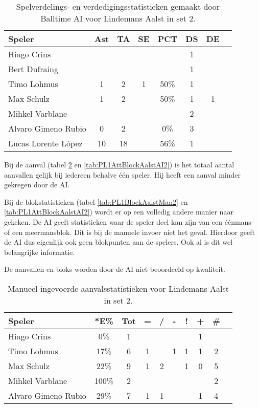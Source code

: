 \begin{table}[ht!]
  \centering
  \scriptsize
  \begin{tabular}{|l|c|c|c|c|c|c|c|} \hline
    \textbf{Speler} & Ast & TA & SE & PCT & DS & DE \\ \hline
    Hiago Crins &  &  &  &  & 1 &  \\
    Bert Dufraing &  &  &  &  & 1 &  \\ 
    Timo Lohmus & 1 & 2 & 1 & 50\% & 1 &  \\
    Max Schulz & 1 & 2 &  & 50\% & 1 & 1 \\
    Mihkel Varblane &  &  &  &  & 2 &  \\
    Alvaro Gimeno Rubio & 0 & 2 &  & 0\% & 3 &  \\
    Lucas Lorente López & 10 & 18 &  & 56\% & 1 &  \\ \hline
  \end{tabular}
  \caption[Spelverdelings- en verdedigingsstatistieken gemaakt door Balltime AI voor Lindemans Aalst in set 2]{\label{tab:PL1SetDigAalstAI2}Spelverdelings- en verdedigingsstatistieken gemaakt door Balltime AI voor Lindemans Aalst in set 2.}
\end{table}

Bij de aanval (tabel \ref{tab:PL1AttAalstMan2} en \ref{tab:PL1AttBlockAalstAI2}) is het totaal aantal aanvallen gelijk bij iedereen behalve één speler. Hij heeft een aanval minder gekregen door de AI. 

Bij de blokstatistieken (tabel \ref{tab:PL1BlockAalstMan2} en \ref{tab:PL1AttBlockAalstAI2}) wordt er op een volledig andere manier naar gekeken. De AI geeft statistieken waar de speler deel kan zijn van een éénmans- of een meermansblok. Dit is bij de manuele invoer niet het geval. Hierdoor geeft de AI dus eigenlijk ook geen blokpunten aan de spelers. Ook al is dit wel belangrijke informatie.

De aanvallen en bloks worden door de AI niet beoordeeld op kwaliteit.

\begin{table}[ht!]
  \centering
  \scriptsize
    \begin{tabular}{|l|c|c|c|c|c|c|c|c|c|}
      \hline
      \textbf{Speler} & *E\% & Tot & = & / & - & ! & + & \# \\ \hline
      Hiago Crins  & 0\% & 1 &  &  &  &  & 1 &  \\ 
      Timo Lohmus  & 17\% & 6 & 1 &  & 1 & 1 & 1 & 2 \\ 
      Max Schulz  & 22\% & 9 & 1 & 2 &  & 1 & 0 & 5\\
      Mihkel Varblane  & 100\% & 2 &  &  &  &  &  & 2 \\ 
      Alvaro Gimeno Rubio & 29\% & 7 & 1 & 1 &  &  & 1 & 4 \\ \hline 
  \end{tabular}
\caption[Manueel ingevoerde aanvalsstatistieken voor Lindemans Aalst in set 2]{\label{tab:PL1AttAalstMan2}Manueel ingevoerde aanvalsstatistieken voor Lindemans Aalst in set 2.}
\end{table}

